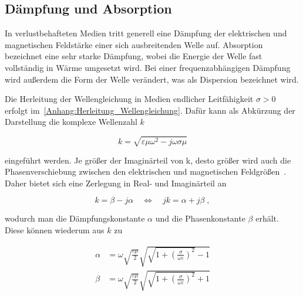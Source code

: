\subsection{Dämpfung und Absorption}\label{cha:2_sub_Daempfung_und_Absorption}


In verlustbehafteten Medien tritt generell eine Dämpfung der elektrischen und magnetischen Feldstärke einer sich ausbreitenden Welle auf. Absorption bezeichnet eine sehr starke Dämpfung, wobei die Energie der Welle fast vollständig in Wärme umgesetzt wird. Bei einer frequenzabhängigen Dämpfung wird außerdem die Form der Welle verändert, was als Dispersion bezeichnet wird. 
\par
\vspace{\linespace}
Die Herleitung der Wellengleichung in Medien endlicher Leitfähigkeit $\sigma > 0$ erfolgt im~\Anhang \ref{Anhang:Herleitung_Wellengleichung}. Dafür kann als Abkürzung der Darstellung die komplexe Wellenzahl $k$

\begin{equation}
    k = \sqrt{\varepsilon \mu \omega^2 - j \omega \sigma \mu}
\end{equation}

eingeführt werden. Je größer der Imaginärteil von k, desto größer wird auch die Phasenverschiebung zwischen den elektrischen und magnetischen Feldgrößen~\cite{EM_Schirmung}. Daher bietet sich eine Zerlegung in Real- und Imaginärteil an

\begin{equation}
    k = \beta - j \alpha \quad \Leftrightarrow \quad jk = \alpha + j\beta \; ,
\end{equation}

wodurch man die Dämpfungskonstante $\alpha$ und die Phasenkonstante $\beta$ erhält. Diese können wiederum aus $k$ zu

\begin{align}
    \alpha &= \omega \sqrt{\frac{\varepsilon \mu}{2}} \sqrt{\sqrt{1+\left(\frac{\sigma}{\omega\varepsilon}\right)^2}-1} \\
    \beta &= \omega \sqrt{\frac{\varepsilon \mu}{2}} \sqrt{\sqrt{1+\left(\frac{\sigma}{\omega\varepsilon}\right)^2}+1}
\end{align}

